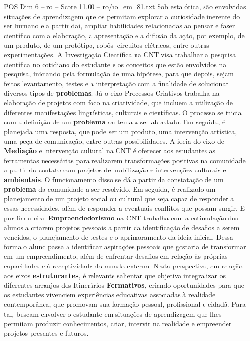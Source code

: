 \begin{textsample}{POS Dim 6 – ro – Score 11.00 – ro/ro\_em\_81.txt}
Sob esta ótica, são envolvidas situações de aprendizagem que os permitam explorar a curiosidade inerente do ser humano e a partir daí, ampliar habilidades relacionadas ao pensar e fazer científico com a elaboração, a apresentação e a difusão da ação, por exemplo, de um produto, de um protótipo, robôs, circuitos elétricos, entre outras experimentações.
A Investigação Científica na CNT visa trabalhar a pesquisa científica no cotidiano do estudante e os conceitos que estão envolvidos na pesquisa, iniciando pela formulação de uma hipótese, para que depois, sejam feitos levantamento, testes e a interpretação com a finalidade de solucionar diversos tipos de \textbf{problemas}.
Já o eixo Processos Criativos trabalha na elaboração de projetos com foco na criatividade, que incluem a utilização de diferentes manifestações linguísticas, culturais e científicas.
O processo se inicia com a definição de um \textbf{problema} ou tema a ser abordado.
Em seguida, é planejada uma resposta, que pode ser um produto, uma intervenção artística, uma peça de comunicação, entre outras possibilidades.
A ideia do eixo de \textbf{Mediação} e intervenção cultural na CNT é oferecer aos estudantes as ferramentas necessárias para realizarem transformações positivas na comunidade a partir do contato com projetos de mobilização e intervenções culturais e \textbf{ambientais}.
O funcionamento disso se dá a partir da constatação de um \textbf{problema} da comunidade a ser resolvido.
Em seguida, é realizado um planejamento de um projeto social ou cultural que seja capaz de responder a essas necessidades, além de responder a eventuais conflitos que possam surgir.
E por fim o eixo \textbf{Empreendedorismo} na CNT trabalha com a estimulação dos alunos a criarem projetos pessoais a partir da identificação de desafios a serem vencidos, o planejamento de testes e o aprimoramento da ideia inicial.
Dessa forma o aluno passa a identificar aspirações pessoais que gostaria de transformar em um empreendimento, além de enfrentar desafios em relação às próprias capacidades e à receptividade do mundo externo.
Nesta perspectiva, em relação aos eixos \textbf{estruturantes}, é relevante salientar que objetiva integralizar os diferentes arranjos dos Itinerários \textbf{Formativos}, criando oportunidades para que os estudantes vivenciem experiências educativas associadas à realidade contemporânea, que promovam sua formação pessoal, profissional e cidadã.
Para tal, buscam envolver o estudante em situações de aprendizagem que lhes permitam produzir conhecimentos, criar, intervir na realidade e empreender projetos presentes e futuros.

\end{textsample}

